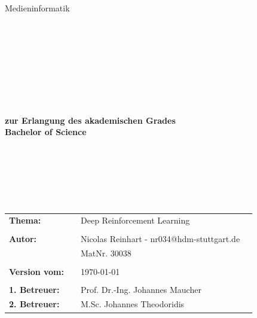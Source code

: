 \begin{center}
\Large{Medieninformatik}
\end{center}
\begin{verbatim}




\end{verbatim}
\begin{center}
\doublespacing
\textbf{\LARGE{\titleDocument}}\\
\singlespacing
\begin{verbatim}

\end{verbatim}
\textbf{{~\subjectDocument}}
\end{center}
\begin{center}
\textbf{zur Erlangung des akademischen Grades \\ Bachelor of Science}
\end{center}
\begin{verbatim}






\end{verbatim}
\begin{flushleft}
\begin{tabular}{llll}
\textbf{Thema:} & & Deep Reinforcement Learning & \\
& &  \\
\textbf{Autor:} & & Nicolas Reinhart - nr034@hdm-stuttgart.de& \\
& & MatNr. 30038 & \\
& & \\
\textbf{Version vom:} & & \today &\\
& & \\
\textbf{1. Betreuer:} & & Prof. Dr.-Ing. Johannes Maucher &\\
\textbf{2. Betreuer:} & & M.Sc. Johannes Theodoridis &\\
\end{tabular}
\end{flushleft}
